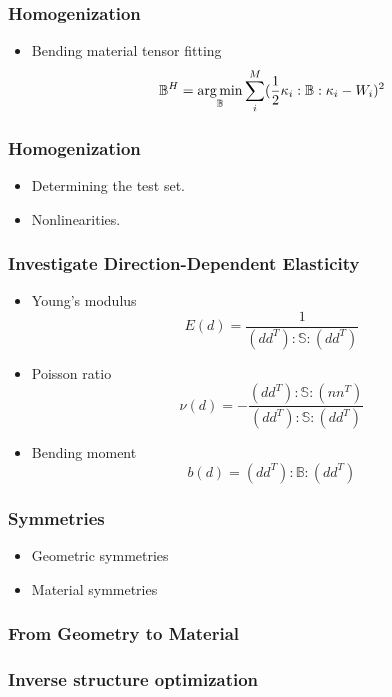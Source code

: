 \documentclass[serif,mathserif, 12pt]{beamer}
\newcommand{\argmin}{\operatornamewithlimits{arg\min}}
\begin{document}
\begin{frame}
  \frametitle{Homogenization}
  \begin{itemize}
  \item Bending material tensor fitting
    \[
    \mathbb{B}^H = \argmin_{\mathbb{B}}\sum_i^M (\frac{1}{2}\kappa_i:\mathbb{B}:\kappa_i-W_i)^2
    \]
  \end{itemize}  
\end{frame}

\begin{frame}
  \frametitle{Homogenization}
  \begin{itemize}
  \item Determining the test set.
  \item Nonlinearities.
  \end{itemize}  
\end{frame}

\begin{frame}
  \frametitle{Investigate Direction-Dependent Elasticity}
  \begin{itemize}
  \item Young's modulus
    \[
    E(d) = \frac{1}{(dd^T):\mathbb{S}:(dd^T)}
    \]
  \item Poisson ratio
    \[
    \nu(d) = -\frac{(dd^T):\mathbb{S}:(nn^T)}{(dd^T):\mathbb{S}:(dd^T)}
    \]
  \item Bending moment
    \[
    b(d) = (dd^T):\mathbb{B}:(dd^T)
    \]
  \end{itemize}
\end{frame}

\begin{frame}
  \frametitle{Symmetries}
  \begin{itemize}
  \item Geometric symmetries
  \item Material symmetries
  \end{itemize}
\end{frame}

\begin{frame}
  \frametitle{From Geometry to Material}
  
\end{frame}

\begin{frame} 
\end{frame}

\begin{frame}
  \frametitle{Inverse structure optimization}
  
\end{frame}

\begin{frame} 
\end{frame}
\end{document}

